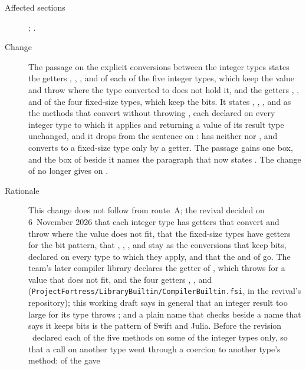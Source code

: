 \begin{description}
\item[Affected sections] ; .
\item[Change] The passage on the explicit conversions between the integer types
states the getters , , ,  and
 of each of the five integer types, which keep the value and throw
 where the type converted to does not hold it, and the
getters , ,  and 
of the four fixed-size types, which keep the bits.
It states , , ,  and  as
the methods that convert without throwing , each declared on
every integer type to which it applies and returning a value of its result type
unchanged, and it drops  from the sentence on :
 has neither  nor , and converts to a
fixed-size type only by a getter.
The passage gains one box, and the box of  beside it names
the paragraph that now states .
The change of  no longer gives  on
.
\item[Rationale] This change does not follow from route~A; the revival decided on
6~November 2026 that each integer type has getters that convert and throw
 where the value does not fit, that the fixed-size types
have getters for the bit pattern, that , , ,
 and  stay as the conversions that keep bits, declared on
every type to which they apply, and that the  and  of
 go.
The team's later compiler library declares the getter  of
, which throws  for a value that does not
fit, and the four getters , , 
and  (\nolinkurl{ProjectFortress/LibraryBuiltin/CompilerBuiltin.fsi},
in the revival's repository); this working draft says in general that an
integer result too large for its type throws ; and a plain
name that checks beside a name that says it keeps bits is the pattern of Swift
and Julia.
Before the revision \library\ declared each of the five methods on some of the
integer types only, so that a call on another type went through a coercion to
another type's method:  of the   gave

\end{description}

